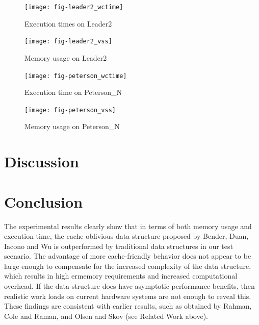 \documentclass{acm_proc_article-sp}
\begin{document}
\begin{figure}
\centering
\texttt{[image: fig-leader2\_wctime]}
\caption{Execution times on Leader2}
\label{fig-leader2_wctime}
\end{figure}

\begin{figure}
\centering
\texttt{[image: fig-leader2\_vss]}
\caption{Memory usage on Leader2}
\label{leader2_vss}
\end{figure}

\begin{figure}
\centering
\texttt{[image: fig-peterson\_wctime]}
\caption{Execution time on Peterson\_N}
\label{fig-peterson_wctime}
\end{figure}

\begin{figure}
\centering
\texttt{[image: fig-peterson\_vss]}
\caption{Memory usage on Peterson\_N}
\label{fig-peterson_vss}
\end{figure}

%
%


\section{Discussion}

\section{Conclusion}
The experimental results clearly show that in terms of both memory usage and
execution time, the cache-oblivious data structure proposed by Bender, Duan,
Iacono and Wu is outperformed by traditional data structures in our test scenario.
The advantage of more cache-friendly behavior does not appear to be large enough
to compensate for the increased complexity of the data structure, which results in
high ermemory requirements and increased computational overhead.
If the data structure does have asymptotic performance benefits, then realistic
work loads on current hardware systems are not enough to reveal this.
These findings are consistent with earlier results, such as obtained by
Rahman, Cole and Raman, and Olsen and Skov (see Related Work above).
\end{document}
